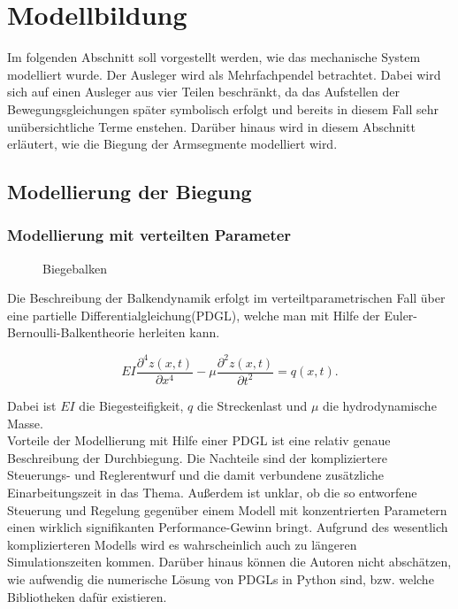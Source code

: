 \chapter{Modellbildung}
Im folgenden Abschnitt soll vorgestellt werden, wie das mechanische System modelliert wurde. 
Der Ausleger wird als Mehrfachpendel betrachtet. Dabei wird sich auf einen Ausleger aus vier Teilen beschränkt, da das Aufstellen der Bewegungsgleichungen später symbolisch erfolgt und bereits in diesem Fall sehr unübersichtliche Terme enstehen. Darüber hinaus wird in diesem Abschnitt erläutert, wie die Biegung der Armsegmente modelliert wird.

\section{Modellierung der Biegung}
\subsection{Modellierung mit verteilten Parameter}

\begin{figure}[h!]
\centering
\def\svgscale{0.8}

\caption{Biegebalken}
\label{fig:VertPara}
\end{figure}

Die Beschreibung der Balkendynamik erfolgt im verteiltparametrischen Fall über eine partielle Differentialgleichung(PDGL), welche man mit Hilfe der Euler-Bernoulli-Balkentheorie herleiten kann. 

\begin{equation}
EI\dfrac{\partial^4 z(x,t)}{\partial x^4}-\mu \dfrac{\partial^2 z(x,t)}{\partial t^2} = q(x,t).
\end{equation}

Dabei ist $EI$ die Biegesteifigkeit, $q$ die Streckenlast und $\mu$ die hydrodynamische Masse.\\
Vorteile der Modellierung mit Hilfe einer PDGL ist eine relativ genaue Beschreibung der Durchbiegung. Die Nachteile sind der kompliziertere Steuerungs- und Reglerentwurf und die damit verbundene zusätzliche Einarbeitungszeit in das Thema. Außerdem ist unklar, ob die so entworfene Steuerung und Regelung gegenüber einem Modell mit konzentrierten Parametern einen wirklich signifikanten Performance-Gewinn bringt. Aufgrund des wesentlich komplizierteren Modells wird es wahrscheinlich auch zu längeren Simulationszeiten kommen. Darüber hinaus können die Autoren nicht abschätzen, wie aufwendig die numerische Lösung von PDGLs in Python sind, bzw. welche Bibliotheken dafür existieren.



